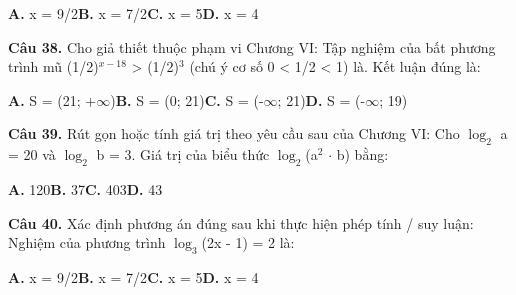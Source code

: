 \documentclass[11pt,a4paper]{article}
\begin{document}
\hspace*{1.5em}\textbf{A.} x = 9/2\quad\quad \textbf{B.} x = 7/2\quad\quad \textbf{C.} x = 5\quad\quad \textbf{D.} x = 4\par\vspace{2pt}
\textbf{\color{primary} Câu 38.} Cho giả thiết thuộc phạm vi Chương VI: Tập nghiệm của bất phương trình mũ (1/2)$^{x - 18}$ > (1/2)$^3$ (chú ý cơ số 0 < 1/2 < 1) là. Kết luận đúng là:\par
\hspace*{1.5em}\textbf{A.} S = (21; +$\infty$)\quad\quad \textbf{B.} S = (0; 21)\quad\quad \textbf{C.} S = (-$\infty$; 21)\quad\quad \textbf{D.} S = (-$\infty$; 19)\par\vspace{2pt}
\textbf{\color{primary} Câu 39.} Rút gọn hoặc tính giá trị theo yêu cầu sau của Chương VI: Cho $\log_2$ a = 20 và $\log_2$ b = 3. Giá trị của biểu thức $\log_2$(a$^2$ $\cdot$ b) bằng:\par
\hspace*{1.5em}\textbf{A.} 120\quad\quad \textbf{B.} 37\quad\quad \textbf{C.} 403\quad\quad \textbf{D.} 43\par\vspace{2pt}
\textbf{\color{primary} Câu 40.} Xác định phương án đúng sau khi thực hiện phép tính / suy luận: Nghiệm của phương trình $\log_3$(2x - 1) = 2 là:\par
\hspace*{1.5em}\textbf{A.} x = 9/2\quad\quad \textbf{B.} x = 7/2\quad\quad \textbf{C.} x = 5\quad\quad \textbf{D.} x = 4\par\vspace{2pt}
\end{document}
